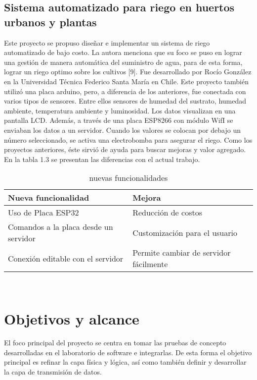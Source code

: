 \subsection{Sistema automatizado para riego en huertos urbanos y plantas}
Este proyecto se propuso diseñar e implementar un sistema de riego automatizado de bajo costo. La autora menciona que su foco se puso en lograr una gestión de manera automática del suministro de agua, para de esta forma, lograr un riego optimo sobre los cultivos [9]. Fue desarrollado por Rocío González en la Universidad Técnica Federico Santa María en Chile.
Este proyecto también utilizó una placa arduino, pero, a diferencia de los anteriores, fue conectada con varios tipos de sensores. Entre ellos sensores de humedad del sustrato, humedad ambiente, temperatura ambiente y luminosidad. Los datos visualizan en una pantalla LCD. Además, a través de una placa ESP8266 con módulo WifI se enviaban los datos a un servidor. Cuando los valores se colocan por debajo un número seleccionado, se activa una electrobomba para asegurar el riego. Como los proyectos anteriores, éste sirvió de ayuda para buscar mejoras y valor agregado. En la tabla 1.3 se presentan las diferencias con el actual trabajo.\\

\begin{table}[h]
	\centering
	\caption[nuevas funcionalidades sobre el proyecto de Rocío González]{nuevas funcionalidades}
	\begin{tabular}{l l}    
		\toprule
		\textbf{Nueva funcionalidad} & \textbf{Mejora}\\	
		\midrule
		Uso de Placa ESP32           & Reducción de costos	\\		
		Comandos a la placa desde un servidor          & Customización para el usuario\\	
		Conexión editable con el servidor & Permite cambiar de servidor fácilmente\\	
		\bottomrule
		\hline
	\end{tabular}
	\label{tab:peces}\\
\end{table}


\section{Objetivos y alcance}
El foco principal del proyecto se centra en tomar las pruebas de concepto desarrolladas en el laboratorio de software e integrarlas. De esta forma el objetivo principal es refinar la capa física y lógica, así como también definir y desarrollar la capa de transmisión de datos.

